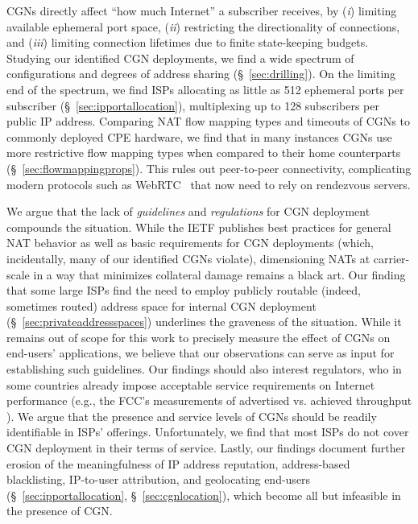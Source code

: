 \documentclass[10pt]{sig-alternate-05-2015}
\newcommand\xref[1]{\S~\ref{#1}}
\def\first{({\it i})\xspace}
\def\second{({\it ii})\xspace}
\def\third{({\it iii})\xspace}
\begin{document}
{CGNs directly affect ``how much Internet'' a subscriber receives, by \first
limiting available ephemeral port space, \second restricting 
the directionality of connections, and \third limiting connection 
lifetimes due to finite state-keeping budgets.  Studying our identified CGN 
deployments, we find 
a wide spectrum of configurations and degrees of address sharing 
(\xref{sec:drilling}). On the limiting end of the spectrum, we find ISPs 
allocating as little as 512 ephemeral ports per subscriber
(\xref{sec:ipportallocation}), multiplexing up to 128 subscribers per public 
IP address. Comparing NAT flow mapping types and timeouts of CGNs to commonly 
deployed CPE hardware, we find that in many instances CGNs use more 
restrictive flow mapping types when compared to their home counterparts 
(\xref{sec:flowmappingprops}). This rules out peer-to-peer connectivity,
complicating modern protocols such as WebRTC~\cite{rfc7478} that now need to
rely on rendezvous servers.

We argue that the lack of \textit{guidelines} and \textit{regulations}
for CGN deployment compounds the situation. While the IETF publishes
best practices for general NAT behavior \cite{rfc4787,rfc5382,rfc7857}
as well as basic requirements for CGN deployments \cite{rfc6888}
(which, incidentally, many of our identified CGNs violate),
dimensioning NATs at carrier-scale in a way that minimizes collateral
damage remains a black art. Our finding that some large ISPs find the
need to employ publicly routable (indeed, sometimes routed) address
space for internal CGN deployment (\xref{sec:privateaddressspaces})
underlines the graveness of the situation.
While it remains out of scope for this work to precisely measure the
effect of CGNs on end-users' applications, we believe that our
observations can serve as input for establishing such guidelines.
Our findings should also interest regulators, who in some countries
already impose acceptable service requirements on Internet performance
(e.g., the FCC's measurements of advertised vs. achieved throughput
\cite{johnston2013measuring}).  We argue that the presence and service
levels of CGNs should be readily identifiable in ISPs'
offerings. Unfortunately, we find that most ISPs do not cover CGN
deployment in their terms of service.
Lastly, our findings document further erosion of the meaningfulness of
IP address reputation, address-based blacklisting, IP-to-user
attribution, and geolocating end-users (\xref{sec:ipportallocation},
\xref {sec:cgnlocation}), which become all but infeasible in the
presence of CGN.






}
\end{document}
